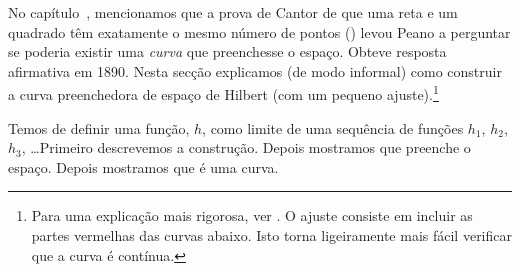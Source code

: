 \documentclass[../../../include/open-logic-section]{subfiles}
\begin{document}


No capítulo~, mencionamos que a prova de Cantor de que
uma reta e um quadrado têm exatamente o mesmo número de pontos
() levou Peano a
perguntar se poderia existir uma \emph{curva} que preenchesse o espaço. Obteve
resposta afirmativa em 1890. Nesta secção explicamos (de modo informal) como
construir a curva preenchedora de espaço de Hilbert (com um pequeno
ajuste).\footnote{Para uma explicação mais rigorosa, ver
\cite{Rose2010}. O ajuste consiste em incluir as partes vermelhas
das curvas abaixo. Isto torna ligeiramente mais fácil verificar que
a curva é contínua.}

Temos de definir uma função, $h$, como limite de uma sequência de funções $h_1$, $h_2$, $h_3$, \dots\@ Primeiro descrevemos a construção. Depois mostramos que preenche o espaço. Depois mostramos que é uma curva.
\end{document}

